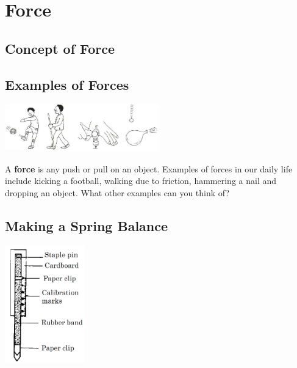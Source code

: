\section{Force}

\begin{multicols}{2}

\section*{Concept of Force}


\subsection{Examples of Forces}
\begin{center}
\includegraphics[width=0.5\textwidth]{./img/vso/forces-ex.jpg}
\end{center}

A \textbf{force} is any push or pull on an object. Examples of forces in our daily life include kicking a football, walking due to friction, hammering a nail and dropping an object. What other examples can you think of?

\subsection{Making a Spring Balance}

\begin{center}
\includegraphics[width=0.26\textwidth]{./img/source/spring-balance.png}
\end{center}


\end{multicols}
